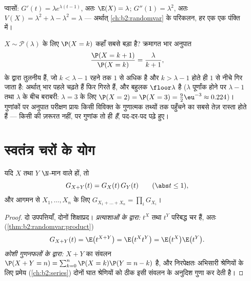 \begin{example}
प्वासों: $G'(t) = \lambda e^{\lambda(t-1)}$, अतः $\E(X) = \lambda$; $G''(1) = \lambda^2$, अतः $V(X) = \lambda^2 + \lambda - \lambda^2 =
\lambda$ --- अर्थात् \cref{ch:b2:randomvar} के परिकलन,
हर एक एक पंक्ति में।
\end{example}

\begin{example}[किसी प्वासों नियम का बहुलक]
\label{ex:b2:genfun:poissonmode}
$X \sim \mathcal
P(\lambda)$ के लिए $\P(X = k)$ कहाँ सबसे बड़ा है? क्रमागत भार अनुपात
\[
\frac{\P(X = k+1)}{\P(X = k)} = \frac{\lambda}{k + 1} ,
\]
के द्वारा तुलनीय हैं, जो $k < \lambda - 1$ रहने तक $1$ से अधिक है और $k > \lambda - 1$ होते ही
$1$ से नीचे गिर जाता है: अर्थात् भार पहले चढ़ते हैं फिर गिरते हैं,
और बहुलक $\floor\lambda$ है ($\lambda$ पूर्णांक होने पर $\lambda - 1$ तथा $\lambda$ के बीच
बराबरी: $\lambda = 3$ के लिए $\P(X = 2) = \P(X = 3) = \frac92\eu^{-3} \approx 0.224$)। गुणांकों पर अनुपात परीक्षण प्रायः किसी
विविक्त  के गुणात्मक तथ्यों तक पहुँचने का सबसे तेज़ रास्ता होते
हैं --- किसी  की ज़रूरत नहीं, पर गुणांक तो  ही
\emph{हैं}, पद-दर-पद पढ़े हुए।
\end{example}

\section{स्वतंत्र चरों के योग}

\begin{theorem}[गुणनात्मकता]\label{thm:b2:genfun:product}
यदि $X$ तथा $Y$  $\N$-मान वाले  हों, तो
\[
G_{X + Y}(t) = G_X(t)\,G_Y(t)
\qquad (\abs t \leq 1),
\]
और आगमन से  $X_1, \dots, X_n$ के लिए $G_{X_1 + \dots + X_n} = \prod_i G_{X_i}$।
\end{theorem}

\begin{proof}
दो उपपत्तियाँ, दोनों शिक्षाप्रद। \emph{प्रत्याशाओं के द्वारा:}
$t^X$ तथा $t^Y$  परिबद्ध चर हैं, अतः (\cref{thm:b2:randomvar:product})
\[
G_{X+Y}(t) = \E\bigl(t^{X+Y}\bigr)
= \E\bigl(t^X t^Y\bigr)
= \E\bigl(t^X\bigr)\E\bigl(t^Y\bigr) .
\]
\emph{कोशी गुणनफलों के द्वारा:} $X + Y$ का  संवलन $\P(X + Y = n) = \sum_{k=0}^n \P(X = k)\P(Y = n - k)$ है, और
निरपेक्षतः अभिसारी श्रेणियों के लिए  प्रमेय (\cref{ch:b2:series}) दोनों
घात श्रेणियों को ठीक इसी संवलन के अनुदिश गुणा कर देती है।
\end{proof}


